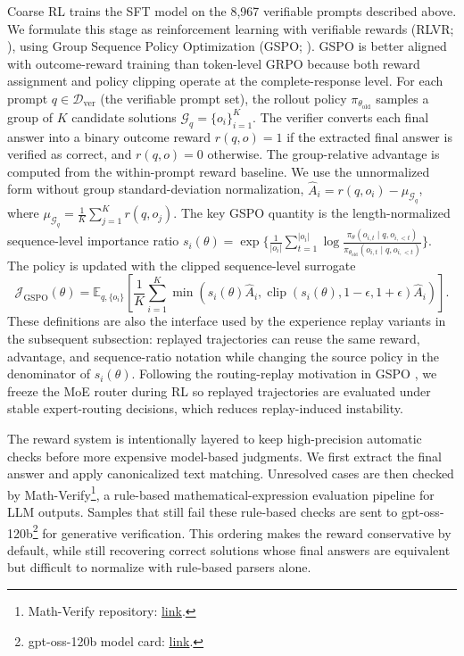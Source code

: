 \documentclass{llmxive}
\begin{document}
Coarse RL trains the SFT model on the 8,967 verifiable prompts described above.
We formulate this stage as reinforcement learning with verifiable rewards
(RLVR; \citealt{lambert2024tulu,r1}), using Group Sequence Policy Optimization
(GSPO; \citealt{zheng2025gspo}). GSPO is better aligned with outcome-reward
training than token-level GRPO because both reward assignment and policy
clipping operate at the complete-response level. For each prompt
$q \in \mathcal{D}_{\mathrm{ver}}$ (the verifiable prompt set), the rollout policy
$\pi_{\theta_{\mathrm{old}}}$ samples a group of $K$ candidate solutions
$\mathcal{G}_q=\{o_i\}_{i=1}^K$. The verifier converts each final answer into a
binary outcome reward $r(q,o)=1$ if the extracted final answer is verified as
correct, and $r(q,o)=0$ otherwise.
The group-relative advantage is computed from the within-prompt reward baseline.
We use the unnormalized form without group standard-deviation normalization,
$\widehat{A}_i=r(q,o_i)-\mu_{\mathcal{G}_q}$, where
$\mu_{\mathcal{G}_q}=\frac{1}{K}\sum_{j=1}^{K}r(q,o_j)$.
The key GSPO quantity is the length-normalized sequence-level importance ratio
$s_i(\theta)=\exp\{\frac{1}{|o_i|}\sum_{t=1}^{|o_i|}\log
\frac{\pi_{\theta}(o_{i,t}\mid q,o_{i,<t})}
{\pi_{\theta_{\mathrm{old}}}(o_{i,t}\mid q,o_{i,<t})}\}$. The policy is
updated with the clipped sequence-level surrogate
\begin{equation}
\mathcal{J}_{\mathrm{GSPO}}(\theta)=
\mathbb{E}_{q,\{o_i\}}
\left[
\frac{1}{K}\sum_{i=1}^{K}
\min\left(
s_i(\theta)\widehat{A}_i,
\operatorname{clip}(s_i(\theta),1-\epsilon,1+\epsilon)\widehat{A}_i
\right)
\right].
\label{eq:coarse-gspo-objective}
\end{equation}
These definitions are also the interface used by the experience replay variants in the subsequent subsection: 
replayed trajectories can reuse the same reward, advantage, and sequence-ratio
notation while changing the source policy in the denominator of $s_i(\theta)$.
Following the routing-replay motivation in GSPO \citep{zheng2025gspo}, we freeze
the MoE router during RL so replayed trajectories are evaluated under stable
expert-routing decisions, which reduces replay-induced instability.

The reward system is intentionally layered to keep high-precision automatic
checks before more expensive model-based judgments. We first extract the final
answer and apply canonicalized text matching. Unresolved cases are then checked by Math-Verify\footnote{Math-Verify
repository: \href{https://github.com/huggingface/Math-Verify}{link}.}, a
rule-based mathematical-expression evaluation pipeline for LLM outputs. Samples
that still fail these rule-based checks are sent to
gpt-oss-120b\footnote{gpt-oss-120b model card:
\href{https://huggingface.co/openai/gpt-oss-120b}{link}.} \citep{openai2025gptoss}
for generative verification. This ordering makes the reward conservative by
default, while still recovering correct solutions whose final answers are
equivalent but difficult to normalize with rule-based parsers alone.
\end{document}
